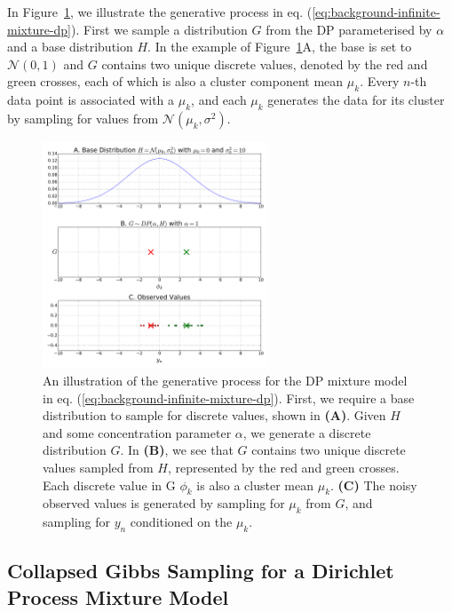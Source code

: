 In Figure~\ref{fig:g-from-dp}, we illustrate the generative process in eq. (\ref{eq:background-infinite-mixture-dp}). First we sample a distribution $G$ from the DP parameterised by $\alpha$ and a base distribution $H$. In the example of Figure~\ref{fig:g-from-dp}A, the base is set to $\mathcal{N}(0, 1)$ and $G$ contains two unique discrete values, denoted by the red and green crosses, each of which is also a cluster component mean $\mu_k$. Every $n$-th data point is associated with a $\mu_k$, and each $\mu_k$ generates the data for its cluster by sampling for values from $\mathcal{N}(\mu_k, \sigma^2)$. 
\begin{figure}
\noindent \begin{centering}
\includegraphics[width=0.6\textwidth]{03-machine-learning/figures/dp_samples.pdf}
\par\end{centering}
\caption[An illustration of the generative process for the DP mixture model in eq. (\ref{eq:background-infinite-mixture-dp}).]{\label{fig:g-from-dp}An illustration of the generative process for the DP mixture model in eq. (\ref{eq:background-infinite-mixture-dp}). First, we require a base distribution to sample for discrete values, shown in \textbf{(A)}. Given $H$ and some concentration parameter $\alpha$, we generate a discrete distribution $G$. In \textbf{(B)}, we see that $G$ contains two unique discrete values sampled from $H$, represented by the red and green crosses. Each discrete value in G $\phi_k$ is also a cluster mean $\mu_k$. \textbf{(C)} The noisy observed values is generated by sampling for $\mu_k$ from $G$, and sampling for $y_n$ conditioned on the $\mu_k$.}
\end{figure}

\subsection{Collapsed Gibbs Sampling for a Dirichlet Process Mixture Model \label{background-cgs-dpmixture}}

